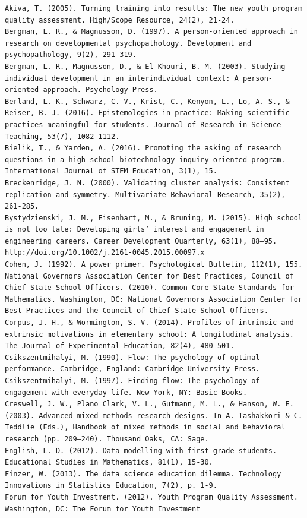 \documentclass[]{book}
\theoremstyle{definition}
\theoremstyle{definition}
\theoremstyle{definition}
\theoremstyle{remark}
\begin{document}
\begin{verbatim}
Akiva, T. (2005). Turning training into results: The new youth program quality assessment. High/Scope Resource, 24(2), 21-24.  
Bergman, L. R., & Magnusson, D. (1997). A person-oriented approach in research on developmental psychopathology. Development and psychopathology, 9(2), 291-319.  
Bergman, L. R., Magnusson, D., & El Khouri, B. M. (2003). Studying individual development in an interindividual context: A person-oriented approach. Psychology Press.  
Berland, L. K., Schwarz, C. V., Krist, C., Kenyon, L., Lo, A. S., & Reiser, B. J. (2016). Epistemologies in practice: Making scientific practices meaningful for students. Journal of Research in Science Teaching, 53(7), 1082-1112.  
Bielik, T., & Yarden, A. (2016). Promoting the asking of research questions in a high-school biotechnology inquiry-oriented program. International Journal of STEM Education, 3(1), 15.  
Breckenridge, J. N. (2000). Validating cluster analysis: Consistent replication and symmetry. Multivariate Behavioral Research, 35(2), 261-285.  
Bystydzienski, J. M., Eisenhart, M., & Bruning, M. (2015). High school is not too late: Developing girls’ interest and engagement in engineering careers. Career Development Quarterly, 63(1), 88–95.   http://doi.org/10.1002/j.2161-0045.2015.00097.x
Cohen, J. (1992). A power primer. Psychological Bulletin, 112(1), 155.  
National Governors Association Center for Best Practices, Council of Chief State School Officers. (2010). Common Core State Standards for Mathematics. Washington, DC: National Governors Association Center for Best Practices and the Council of Chief State School Officers.  
Corpus, J. H., & Wormington, S. V. (2014). Profiles of intrinsic and extrinsic motivations in elementary school: A longitudinal analysis. The Journal of Experimental Education, 82(4), 480-501.  
Csikszentmihalyi, M. (1990). Flow: The psychology of optimal performance. Cambridge, England: Cambridge University Press.  
Csikszentmihalyi, M. (1997). Finding flow: The psychology of engagement with everyday life. New York, NY: Basic Books.  
Creswell, J. W., Plano Clark, V. L., Gutmann, M. L., & Hanson, W. E. (2003). Advanced mixed methods research designs. In A. Tashakkori & C. Teddlie (Eds.), Handbook of mixed methods in social and behavioral research (pp. 209–240). Thousand Oaks, CA: Sage.  
English, L. D. (2012). Data modelling with first-grade students. Educational Studies in Mathematics, 81(1), 15-30.  
Finzer, W. (2013). The data science education dilemma. Technology Innovations in Statistics Education, 7(2), p. 1-9.  
Forum for Youth Investment. (2012). Youth Program Quality Assessment. Washington, DC: The Forum for Youth Investment

\end{verbatim}
\end{document}
